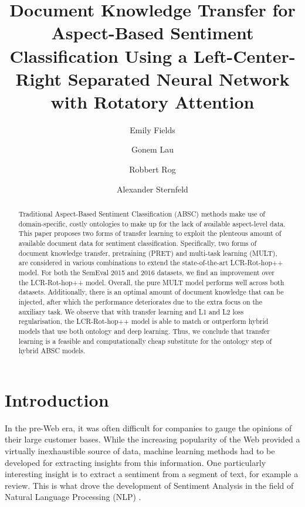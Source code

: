 \documentclass[runningheads]{llncs}
\begin{document}
\title{Document Knowledge Transfer for Aspect-Based Sentiment Classification Using a Left-Center-Right Separated Neural Network with Rotatory Attention}
\author{Emily Fields \and Gonem Lau \and Robbert Rog \and Alexander Sternfeld}
{\def\addcontentsline#1#2#3{}\maketitle}

\begin{abstract}
Traditional Aspect-Based Sentiment Classification (ABSC) methods make use of domain-specific, costly ontologies to make up for the lack of available aspect-level data. This paper proposes two forms of transfer learning to exploit the plenteous amount of available document data for sentiment classification. Specifically, two forms of document knowledge transfer, pretraining (PRET) and multi-task learning (MULT), are considered in various combinations to extend the state-of-the-art LCR-Rot-hop++ model. For both the SemEval 2015 and 2016 datasets, we find an improvement over the LCR-Rot-hop++ model. Overall, the pure MULT model performs well across both datasets. Additionally, there is an optimal amount of document knowledge that can be injected, after which the performance deteriorates due to the extra focus on the auxiliary task. We observe that with transfer learning and L1 and L2 loss regularisation, the LCR-Rot-hop++ model is able to match or outperform hybrid models that use both ontology and deep learning. Thus, we conclude that transfer learning is a feasible and computationally cheap substitute for the ontology step of hybrid ABSC models.
\end{abstract}

\setcounter{secnumdepth}{5}
\setcounter{tocdepth}{5}


\section{Introduction}

In the pre-Web era, it was often difficult for companies to gauge the opinions of their large customer bases. While the increasing popularity of the Web provided a virtually inexhaustible source of data, machine learning methods had to be developed for extracting insights from this information. One particularly interesting insight is to extract a sentiment from a segment of text, for example a review. This is what drove the development of Sentiment Analysis in the field of Natural Language Processing (NLP) \cite{Liu2020}. 
\end{document}
